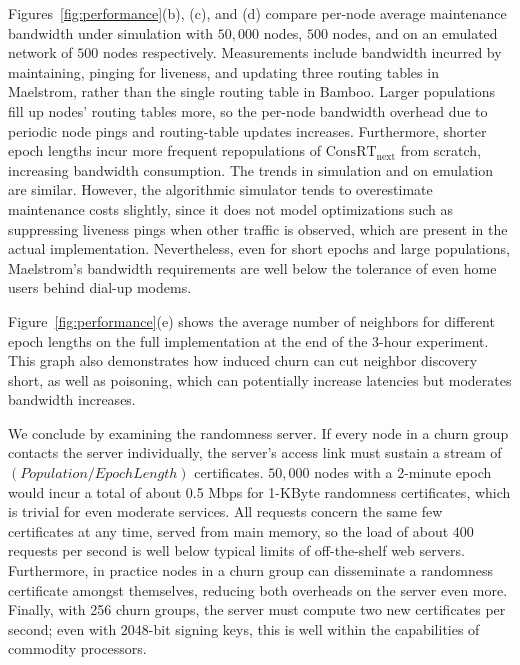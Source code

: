 \documentclass[10pt,twocolumn]{article}
\newcommand{\CRT}{ConsRT\xspace}
\newcommand{\CRTNext}{$\mathrm{\CRT}_{\mbox{next}}$\xspace}
\begin{document}
Figures~\ref{fig:performance}(b), (c), and (d) compare per-node average maintenance
bandwidth under simulation with $50,000$ nodes, $500$ nodes, and on
an emulated network of $500$ nodes respectively.  Measurements include
bandwidth incurred by maintaining, pinging for liveness, and updating
three routing tables in Maelstrom, rather than the single routing table
in Bamboo.  Larger
populations fill up nodes' routing tables more, so the per-node
bandwidth overhead due to periodic node pings and routing-table updates
increases.  Furthermore, shorter epoch lengths incur more frequent
repopulations of \CRTNext from scratch, increasing bandwidth
consumption. The trends in simulation and on emulation are
similar. However, the algorithmic
simulator tends to overestimate maintenance costs slightly, since it does not
model optimizations such as suppressing liveness pings when other
traffic is observed, which are present in the actual implementation.
Nevertheless, even for short epochs and large populations, Maelstrom's bandwidth
requirements are well below the tolerance of even home users behind
dial-up modems.

Figure~\ref{fig:performance}(e) shows the average number of
neighbors for different epoch lengths on the full implementation at the
end of the 3-hour experiment. This graph also demonstrates how
induced churn can cut neighbor discovery short, as well as poisoning, which can potentially increase latencies
but moderates bandwidth increases.


We conclude by examining the
randomness server.  If
every node in a churn group contacts the server
individually, the server's access link must sustain a stream of
$(\mathit{Population}/\mathit{EpochLength})$ certificates.
$50,000$ nodes with a 2-minute epoch would incur a total of about 0.5 Mbps for
1-KByte 
randomness certificates, which
is trivial for even moderate services.  All requests concern the
same few certificates at any time, served from main memory, so the load
of about
$400$ requests per second is well below typical limits of off-the-shelf
web servers.  Furthermore, in practice nodes in a churn group can
disseminate a randomness certificate amongst themselves, reducing both
overheads on the server even more.  Finally, with 256 churn groups, the
server must compute two new certificates per second; even with
$2048$-bit signing keys, this is well within the capabilities of commodity processors.






\label{sec:discussion}
\end{document}

